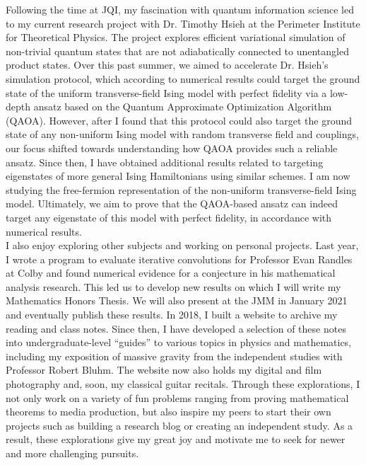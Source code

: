 \documentclass[12pt]{article}
\begin{document}
Following the time at JQI, my fascination with quantum information science led to my current research project with Dr. Timothy Hsieh at the Perimeter Institute for Theoretical Physics. The project explores efficient variational simulation of non-trivial quantum states that are not adiabatically connected to unentangled product states. Over this past summer, we aimed to accelerate Dr. Hsieh's simulation protocol, which according to numerical results could target the ground state of the uniform transverse-field Ising model with perfect fidelity via a low-depth ansatz based on the Quantum Approximate Optimization Algorithm (QAOA). However, after I found that this protocol could also target the ground state of any non-uniform Ising model with random transverse field and couplings, our focus shifted towards understanding how QAOA provides such a reliable ansatz. Since then, I have obtained additional results related to targeting eigenstates of more general Ising Hamiltonians using similar schemes. I am now studying the free-fermion representation of the non-uniform transverse-field Ising model. Ultimately, we aim to prove that the QAOA-based ansatz can indeed target any eigenstate of this model with perfect fidelity, in accordance with numerical results.  \\

I also enjoy exploring other subjects and working on personal projects. Last year, I wrote a program to evaluate iterative convolutions for Professor Evan Randles at Colby and found numerical evidence for a conjecture in his mathematical analysis research. This led us to develop new results on which I will write my Mathematics Honors Thesis. We will also present at the JMM in January 2021 and eventually publish these results. In 2018, I built a website to archive my reading and class notes. Since then, I have developed a selection of these notes into undergraduate-level ``guides'' to various topics in physics and mathematics, including my exposition of massive gravity from the independent studies with Professor Robert Bluhm. The website now also holds my digital and film photography and, soon, my classical guitar recitals. Through these explorations, I not only work on a variety of fun problems ranging from proving mathematical theorems to media production, but also inspire my peers to start their own projects such as building a research blog or creating an independent study. As a result, these explorations give my great joy and motivate me to seek for newer and more challenging pursuits. \\
\end{document}
